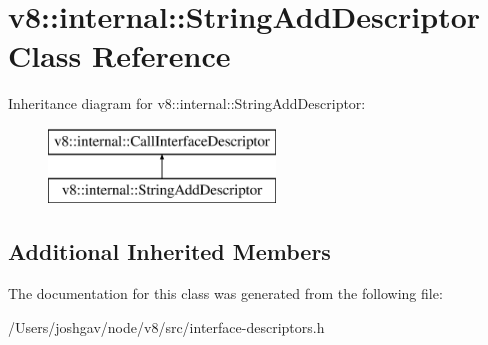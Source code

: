 \hypertarget{classv8_1_1internal_1_1_string_add_descriptor}{}\section{v8\+:\+:internal\+:\+:String\+Add\+Descriptor Class Reference}
\label{classv8_1_1internal_1_1_string_add_descriptor}
Inheritance diagram for v8\+:\+:internal\+:\+:String\+Add\+Descriptor\+:\begin{figure}[H]
\begin{center}
\leavevmode
\includegraphics[height=2.000000cm]{classv8_1_1internal_1_1_string_add_descriptor}
\end{center}
\end{figure}
\subsection*{Additional Inherited Members}


The documentation for this class was generated from the following file\+:\begin{DoxyCompactItemize}
\item 
/\+Users/joshgav/node/v8/src/interface-\/descriptors.\+h\end{DoxyCompactItemize}
